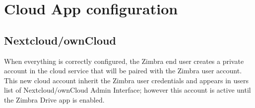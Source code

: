 \section{Cloud App configuration}

\subsection{Nextcloud/ownCloud}\label{==subsec:NextcloudownCloudInstallation==}
    When everything is correctly configured, the Zimbra end user creates a private account in the cloud service
    that will be paired with the Zimbra user account.
    This new cloud account inherit the Zimbra user credentials and appears in users list of Nextcloud/ownCloud Admin Interface;
    however this account is active until the Zimbra Drive app is enabled.

